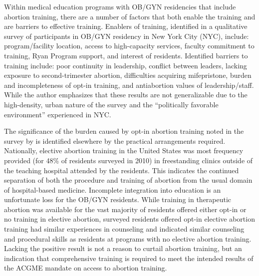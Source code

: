 \documentclass[letterpaper, 12pt]{article}
\begin{document}
Within medical education programs with OB/GYN residencies that include abortion training, there are a number of factors that both enable the training and are barriers to effective training.
Enablers of training, identified in a qualitative survey of participants in OB/GYN residency in New York City (NYC), include: program/facility location, access to high-capacity services, faculty commitment to training, Ryan Program \autocite{bixby_center_for_global_reproductive_health_education_????} \autocite{bixby_center_for_global_reproductive_health_home_????} \autocite{steinauer_benefits_2013} support, and interest of residents. \autocite[pg. 240--2]{guiahi_enablers_2013}
Identified barriers to training include: poor continuity in leadership, conflict between leaders, lacking exposure to second-trimester abortion, difficulties acquiring mifepristone, burden and incompleteness of opt-in training, and antiabortion values of leadership/staff. \autocite[pg. 242]{guiahi_enablers_2013}
While the author emphasizes that these results are not generalizable due to the high-density, urban nature of the survey and the ``politically favorable environment'' experienced in NYC. \autocite[pg. 243]{guiahi_enablers_2013}

The significance of the burden caused by opt-in abortion training noted in the survey by \citeauthor{guiahi_enablers_2013} is identified elsewhere by the practical arrangements required.
Nationally, elective abortion training in the United States was most frequency provided (for 48\% of residents surveyed in 2010) in freestanding clinics outside of the teaching hospital attended by the residents. \autocite[pg. 274]{turk_availability_2014} This indicates the continued separation of both the procedure and training of abortion from the usual domain of hospital-based medicine. Incomplete integration into education is an unfortunate loss for the OB/GYN residents.
While training in therapeutic abortion was available for the vast majority of residents offered either opt-in or no training in elective abortion, surveyed residents offered opt-in elective abortion training had similar experiences in counseling and indicated similar counseling and procedural skills as residents at programs with no elective abortion training. \autocite[pg. 275--6]{turk_availability_2014}
Lacking the positive result is not a reason to curtail abortion training, but an indication that comprehensive training is required to meet the intended results of the ACGME mandate on access to abortion training.
\end{document}
